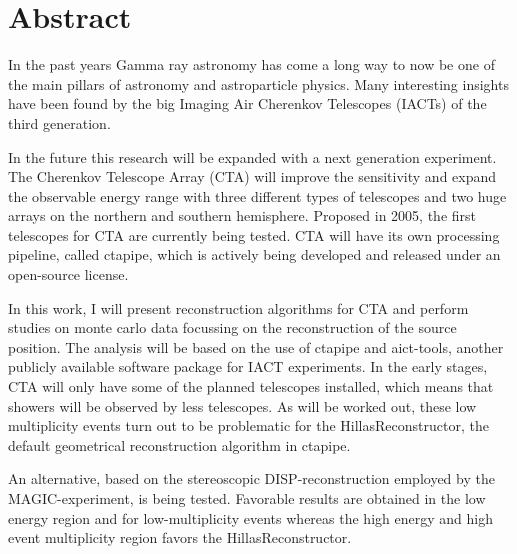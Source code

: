 \thispagestyle{plain}

\iffalse
\section*{Kurzfassung}
\begin{otherlanguage}{german}
In den letzten Jahrzehnten hat die $\gamma$-Astronomie 
viele Erkenntnisse über die Zusammensetzung des Universums gebracht.
Mitverantwortlich dafür waren die großen Image Air Cherenkov Telescope (IACT)
Experimente der dritten Generation.
In Zukunft soll diese Forschung begleitet und erweitert werden 
durch ein Experiment der nächsten Generation.
Das Cherenkov-Teleskope-Array (CTA) wird die Sensitiviät weiter steigern und den
beobachtbaren Energiebereich erweitern.
In dieser Arbeit werden Rekonstruktionsalgorithmen für CTA vorgestellt und Studien auf 
Monte-Carlo-Daten durchgeführt mit dem Fokus auf der frühen Phase des Experimentes.
Zu Beginn werden nur wenige Teleskope errichtet sein, sodass Ereignisse nur 
mit wenigen Teleskopen gesehen werden.
\end{otherlanguage}
\fi

\section*{Abstract}
In the past years Gamma ray astronomy has come a long way
to now be one of the main pillars of astronomy and astroparticle physics.
Many interesting insights have been found by the big Imaging Air Cherenkov Telescopes (IACTs) 
of the third generation.

In the future this research will be expanded with a next generation experiment.
The Cherenkov Telescope Array (CTA) will improve the sensitivity and
expand the observable energy range with 
three different types of telescopes and two huge arrays on the northern and 
southern hemisphere.
Proposed in 2005, the first telescopes for CTA are currently being tested.
CTA will have its own processing pipeline, called ctapipe, which is
actively being developed and released under an open-source license.

In this work, I will present reconstruction algorithms for CTA and perform 
studies on monte carlo data focussing on the reconstruction of the source position.
The analysis will be based on the use of ctapipe and 
aict-tools, another publicly available software package for IACT experiments.
In the early stages, CTA will only have some of the planned telescopes installed,
which means that showers will be observed by less telescopes.
As will be worked out, these low multiplicity events turn out to be problematic for
the HillasReconstructor,
the default geometrical reconstruction algorithm in ctapipe.

An alternative, based on the stereoscopic DISP-reconstruction employed by
the MAGIC-experiment, is being tested.
Favorable results are obtained in the low energy region and for low-multiplicity
events whereas the
high energy and high event multiplicity region favors the HillasReconstructor.
